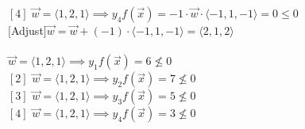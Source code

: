 $[4]\;\vec{w} = \langle 1,2,1\rangle \implies y_4f(\vec{x}) = -1 \cdot \vec{w} \cdot \langle -1,1,-1\rangle = 0 \leq 0$ \\
$[$Adjust$] \vec{w} = \vec{w} + (-1) \cdot \langle -1,1,-1\rangle = \langle 2,1,2 \rangle$
\\
\\
[1] $\vec{w} = \langle 1,2,1 \rangle \implies y_1f(\vec{x}) = 6 \nleq 0$\\
$[2]$ $\vec{w} = \langle 1,2,1 \rangle \implies y_2f(\vec{x}) = 7\nleq 0$\\
$[3]$ $\vec{w} = \langle 1,2,1 \rangle \implies y_3f(\vec{x}) = 5\nleq 0$\\
$[4]$ $\vec{w} = \langle 1,2,1 \rangle \implies y_4f(\vec{x}) = 3\nleq 0$


